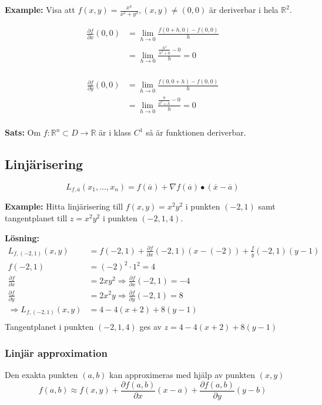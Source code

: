 \textbf{Example:}
Visa att $f(x,y) = \frac{x^4}{x^2+y^2}, (x,y) \neq (0,0)$ är deriverbar i hela $\mathbb{R}^2$.

\begin{align*}
    \frac{\partial f}{\partial x}(0,0) &= \lim_{h\to0}\frac{f(0+h, 0)-f(0,0)}{h} \\
    &= \lim_{h\to0}\frac{\frac{h^4}{h^2+0} - 0}{h} = 0 \\
\end{align*}

\begin{align*}
    \frac{\partial f}{\partial y}(0,0) &= \lim_{h\to0}\frac{f(0, 0+h)-f(0,0)}{h} \\
    &= \lim_{h\to0}\frac{\frac{0}{0^2+h} - 0}{h} = 0 \\
\end{align*}

\textbf{Sats:}
Om $f:\mathbb{R}^n\subset D \to\mathbb{R}$ är i klass $C^1$ så är funktionen deriverbar.

\subsection{Linjärisering}
\begin{equation*}
    L_{f,\overline{a}} (x_1,\ldots,x_n) = f(\overline{a}) 
    + \nabla f(\overline{a})\bullet(\overline{x}-\overline{a})
\end{equation*}

\textbf{Example:}
Hitta linjärisering till $f(x,y)=x^2y^2$ i punkten $(-2,1)$ samt tangentplanet till $z=x^2y^2$
i punkten $(-2,1,4)$.

\textbf{Lösning:}
\begin{align*}
    L_{f,(-2,1)}(x,y) &= f(-2,1) + \frac{\partial f}{\partial x}(-2,1)(x-(-2)) + \frac{f}{y}(-2,1)(y-1) \\
    f(-2,1) &= (-2)^2\cdot 1^2 = 4 \\
    \frac{\partial f}{\partial x} &= 2xy^2 \Rightarrow \frac{\partial f}{\partial x}(-2,1) = -4 \\
    \frac{\partial f}{\partial y} &= 2x^2y \Rightarrow \frac{\partial f}{\partial y}(-2,1) = 8 \\
    \Rightarrow L_{f,(-2,1)}(x,y) &= 4 -4(x+2) + 8(y-1) \\
\end{align*}
Tangentplanet i punkten $(-2,1,4)$ ges av $z=4 -4(x+2) + 8(y-1)$


\subsubsection{Linjär approximation}
Den exakta punkten $(a,b)$ kan approximeras med hjälp av punkten $(x,y)$
\begin{equation*}
    f(a,b) \approx f(x,y) + \frac{\partial f(a,b)}{\partial x}(x-a) + \frac{\partial f(a,b)}{\partial y}(y-b)
\end{equation*}

